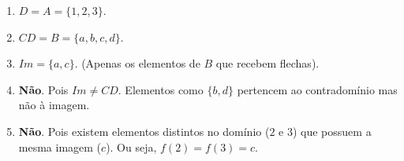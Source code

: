 \documentclass[12pt]{article}
\begin{document}
\begin{enumerate}[label=\arabic*), leftmargin=1.5cm, itemsep=0.5cm]
    \begin{solucao}
        \begin{enumerate}[label=\alph*)]
            \item $D = A = \{1, 2, 3\}$.
            \item $CD = B = \{a, b, c, d\}$.
            \item $Im = \{a, c\}$. (Apenas os elementos de $B$ que recebem flechas).
            \item \textbf{Não}. Pois $Im \neq CD$. Elementos como $\{b, d\}$ pertencem ao contradomínio mas não à imagem.
            \item \textbf{Não}. Pois existem elementos distintos no domínio ($2$ e $3$) que possuem a mesma imagem ($c$). Ou seja, $f(2) = f(3) = c$.
        \end{enumerate}
    \end{solucao}

\end{enumerate}
\end{document}
